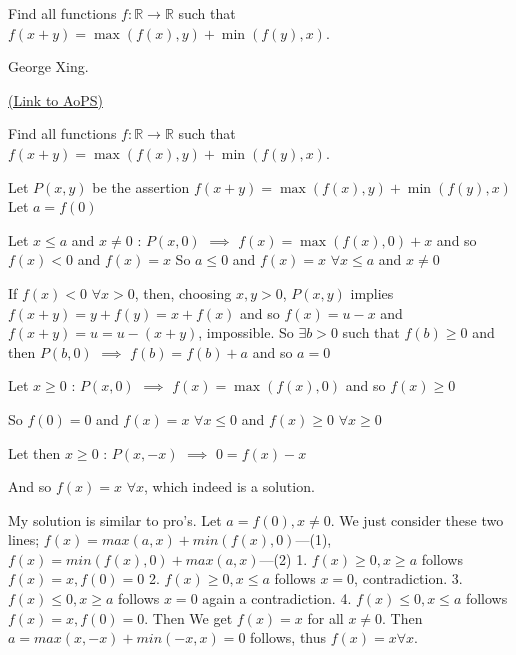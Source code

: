\begin{problem}
	Find all functions $f: \mathbb{R} \to \mathbb{R}$ such that $f(x+y) = \max(f(x),y) + \min(f(y),x)$.

\begin{italicized}George Xing.\end{italicized}
	\flushright \href{https://artofproblemsolving.com/community/c6h487457}{(Link to AoPS)}
\end{problem}



\begin{solution}
	\begin{tcolorbox}Find all functions $f: \mathbb{R} \to \mathbb{R}$ such that $f(x+y) = \max(f(x),y) + \min(f(y),x)$.\end{tcolorbox}
Let $P(x,y)$ be the assertion $f(x+y)=\max(f(x),y)+\min(f(y),x)$
Let $a=f(0)$

Let $x\le a$ and $x\ne 0$ : $P(x,0)$ $\implies$ $f(x)=\max(f(x),0)+x$ and so $f(x)<0$ and $f(x)=x$
So $a\le 0$ and $f(x)=x$ $\forall x\le a$ and $x\ne 0$

If $f(x)<0$ $\forall x>0$, then, choosing $x,y>0$, $P(x,y)$ implies $f(x+y)=y+f(y)=x+f(x)$ and so $f(x)=u-x$ and $f(x+y)=u=u-(x+y)$, impossible.
So $\exists b>0$ such that $f(b)\ge 0$ and then $P(b,0)$ $\implies$ $f(b)=f(b)+a$ and so $a=0$

Let $x\ge 0$ : $P(x,0)$ $\implies$ $f(x)=\max(f(x),0)$ and so $f(x)\ge 0$

So $f(0)=0$ and $f(x)=x$ $\forall x\le 0$ and $f(x)\ge 0$ $\forall x\ge 0$

Let then $x\ge 0$ : $P(x,-x)$ $\implies$ $0=f(x)-x$

And so $\boxed{f(x)=x}$ $\forall x$, which indeed is a solution.
\end{solution}



\begin{solution}
	My solution is similar to pro's.
Let $a=f(0),x\neq 0$. We just consider these two lines;
$f(x)=max(a,x)+min(f(x),0)$---(1), $f(x)=min(f(x),0)+max(a,x)$---(2)
1. $f(x)\ge 0,x\ge a$ follows $f(x)=x,f(0)=0$
2. $f(x)\ge 0, x\le a$ follows $x=0$, contradiction.
3. $f(x)\le 0, x\ge a$ follows $x=0$ again a contradiction.
4. $f(x)\le 0, x\le a$ follows $f(x)=x,f(0)=0$.
Then We get $f(x)=x$ for all $x\neq 0$. Then $a=max(x,-x)+min(-x,x)=0$ follows, thus $\boxed{f(x)=x \forall x}$.
\end{solution}



